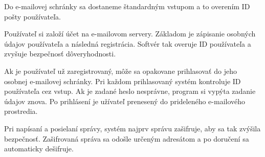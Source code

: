 \documentclass[10pt,twoside,slovak,a4paper]{article}
\begin{document}
\begin{minipage}[thb]{.49\textwidth}
\begin{flushleft}
Do e-mailovej schránky sa dostaneme štandardným vstupom a to overením ID pošty používateľa.\par
\vspace{.2cm}
Používateľ si založí účet na e-mailovom servery. Základom je zápisanie osobných údajov používateľa a následná registrácia. Softvér tak overuje ID používateľa a zvyšuje bezpečnosť dôveryhodnosti.\par
\vspace{.2cm}
Ak je používateľ už zaregistrovaný, môže sa opakovane prihlasovať do jeho osobnej e-mailovej schránky. Pri každom prihlasovaný systém kontroluje ID používateľa cez vstup. Ak je zadané heslo nesprávne, program si vypýta zadanie údajov znova. 
Po prihlásení je užívateľ prenesený do prideleného e-mailového prostredia. \par
\vspace{.2cm}
Pri napísaní a posielaní správy, systém najprv správu zašifruje, aby sa tak zvýšila bezpečnosť. Zašifrovaná správa sa odošle určeným adresátom a po doručení sa automaticky dešifruje.\cite{Acharya_smartmailing}
\end{flushleft}
\end{minipage}
\end{document}
